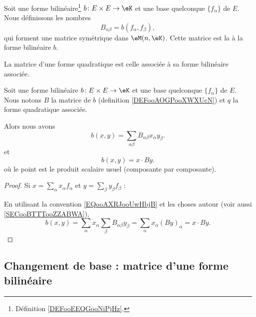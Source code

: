 \begin{definition}      \label{DEFooAOGPooXWXUcN}
    Soit une forme bilinéaire\footnote{Définition \ref{DEFooEEQGooNiPjHz}.} \( b\colon E\times E\to \eK\) et une base quelconque \( \{ f_{\alpha} \}\) de \( E\). Nous définissons les nombres
    \begin{equation}    \label{EQooCUGFooRlKUtu}
        B_{\alpha\beta}=b(f_{\alpha},f_{\beta}),
    \end{equation}
    qui forment une matrice symétrique dans \( \eM(n,\eK)\). Cette matrice est la  à la forme bilinéaire \( b\).

    La matrice d'une forme quadratique est celle associée à sa forme bilinéaire associée.
\end{definition}

\begin{lemma}       \label{LEMooDCIOooTlVZMR}
    Soit une forme bilinéaire \( b\colon E\times E\to \eK\) et une base quelconque \( \{ f_{\alpha} \}\) de \( E\). Nous notons \( B\) la matrice de \( b\) (definition \ref{DEFooAOGPooXWXUcN}) et \( q\) la forme quadratique associée.

    Alors nous avons
\begin{equation}        \label{EQooQFMWooVKVLMx}
    b(x,y)=\sum_{\alpha\beta}B_{\alpha\beta}x_{\alpha}y_{\beta}.
\end{equation}
et
\begin{equation}
    b(x,y)=x\cdot By.
\end{equation}
où le point est le produit scalaire usuel (composante par composante).
\end{lemma}

\begin{proof}
    Si \( x=\sum_{\alpha}x_{\alpha}f_{\alpha}\) et \( y=\sum_{\beta}y_{\beta}f_{\beta}\) :

    En utilisant la convention \eqref{EQooAXRJooUwHbjB} et les choses autour (voir aussi \ref{SECooBTTTooZZABWA}),
    \begin{equation}
        b(x,y)=\sum_{\alpha}x_{\alpha}\sum_{\beta}B_{\alpha\beta}y_{\beta}=\sum_{\alpha}x_{\alpha}(By)_{\alpha}=x\cdot By.
    \end{equation}
\end{proof}

\subsection{Changement de base : matrice d'une forme bilinéaire}

